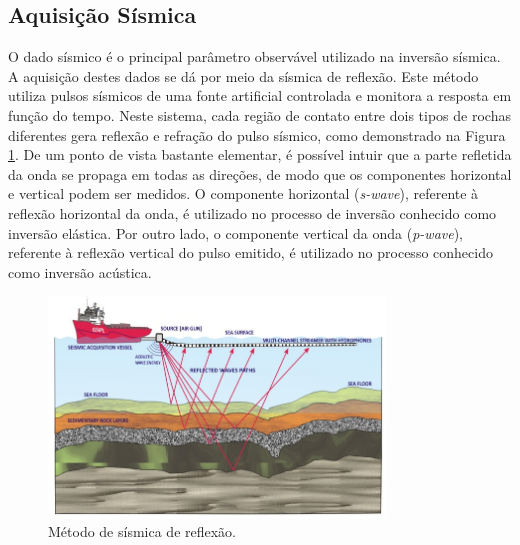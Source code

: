\subsection{Aquisição Sísmica}
O dado sísmico é o principal parâmetro observável utilizado na inversão sísmica.
A aquisição destes dados se dá por meio da sísmica de reflexão. Este
método utiliza pulsos sísmicos de uma fonte artificial controlada e monitora a resposta em
função do tempo. Neste sistema, cada região de contato entre dois tipos de rochas
diferentes gera reflexão e refração do pulso sísmico, como demonstrado na Figura
\ref{fig:1sismica}.
De um ponto de vista bastante elementar, é possível intuir que a parte refletida da onda se
propaga em todas as direções, de modo que os componentes horizontal e vertical podem ser medidos.
O componente horizontal (\textit{s-wave}), referente à reflexão horizontal
da onda, é utilizado no processo de inversão conhecido como inversão elástica. Por outro lado, o componente
vertical da onda (\textit{p-wave}), referente à reflexão vertical do pulso emitido, é utilizado no processo
conhecido como inversão acústica.
\begin{figure}[ht!]
\begin{center}
  \includegraphics[width=0.8\textwidth]{fig/seismic_survey_2}
  \caption{Método de sísmica de reflexão. \citep{figsismica}}
  \label{fig:1sismica}
\end{center}
\end{figure}

